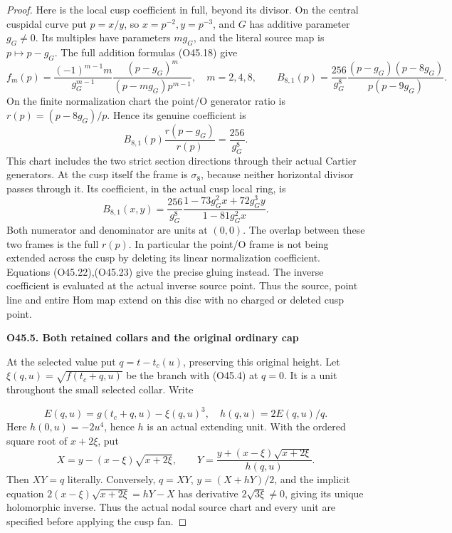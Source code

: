 \begin{proof}
Here is the local cusp coefficient in full, beyond its divisor.
On the central cuspidal curve put \(p=x/y\), so
\(x=p^{-2},y=p^{-3}\), and \(G\) has additive parameter
\(g_G\ne0\). Its multiples have parameters \(mg_G\), and
the literal source map is \(p\mapsto p-g_G\). The full
addition formulas (O45.18) give
\[
 f_m(p)=\frac{(-1)^{m-1}m}{g_G^{m-1}}
 \frac{(p-g_G)^m}{(p-mg_G)p^{m-1}},\quad m=2,4,8,
 \qquad
 B_{8,1}(p)=\frac{256}{g_G^8}
 \frac{(p-g_G)(p-8g_G)}{p(p-9g_G)}.
 \tag{O45.21}
\]
On the finite normalization chart the point/O generator ratio
is \(r(p)=(p-8g_G)/p\). Hence its genuine coefficient is
\[
 B_{8,1}(p)\frac{r(p-g_G)}{r(p)}=\frac{256}{g_G^8}.
 \tag{O45.22}
\]
This chart includes the two strict section directions through
their actual Cartier generators. At the cusp itself the frame
is \(\sigma_8\), because neither horizontal divisor passes
through it. Its coefficient, in the actual cusp local ring,
is
\[
 B_{8,1}(x,y)=\frac{256}{g_G^8}
 \frac{1-73g_G^2x+72g_G^3y}{1-81g_G^2x}.
 \tag{O45.23}
\]
Both numerator and denominator are units at \((0,0)\).
The overlap between these two frames is the full \(r(p)\).
In particular the point/O frame is not being extended across
the cusp by deleting its linear normalization coefficient.
Equations (O45.22),(O45.23) give the precise gluing instead.
The inverse coefficient is evaluated at the actual inverse
source point. Thus the source, point line and entire Hom map
extend on this disc with no charged or deleted cusp point.

\par

\medskip\noindent\textbf{O45.5. Both retained collars and the original ordinary cap}

\par\nobreak

At the selected value put \(q=t-t_c(u)\), preserving this
original height. Let \(\xi(q,u)=\sqrt{f(t_c+q,u)}\) be the
branch with (O45.4) at \(q=0\). It is a unit throughout the
small selected collar. Write

\[
 E(q,u)=g(t_c+q,u)-\xi(q,u)^3,\quad
 h(q,u)=2E(q,u)/q.
 \tag{O45.24}
\]
Here \(h(0,u)=-2u^4\), hence \(h\) is an actual extending
unit. With the ordered square root of \(x+2\xi\), put
\[
 X=y-(x-\xi)\sqrt{x+2\xi},\qquad
 Y=\frac{y+(x-\xi)\sqrt{x+2\xi}}{h(q,u)}.
 \tag{O45.25}
\]
Then \(XY=q\) literally. Conversely, \(q=XY\),
\(y=(X+hY)/2\), and the implicit equation
\(2(x-\xi)\sqrt{x+2\xi}=hY-X\) has derivative
\(2\sqrt{3\xi}\ne0\), giving its unique holomorphic
inverse. Thus the actual nodal source chart and every unit
are specified before applying the cusp fan.


\end{proof}
